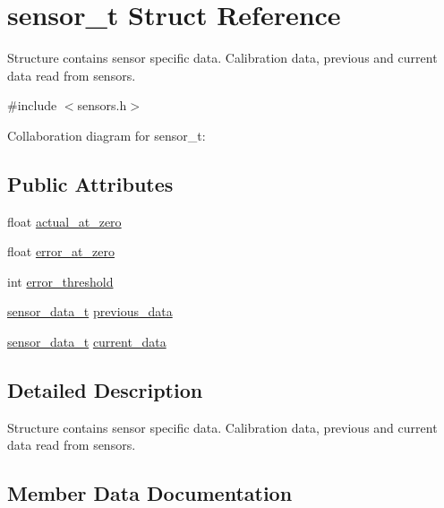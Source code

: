 \hypertarget{structsensor__t}{}\section{sensor\+\_\+t Struct Reference}
\label{structsensor__t}


Structure contains sensor specific data. Calibration data, previous and current data read from sensors.  




{\ttfamily \#include $<$sensors.\+h$>$}



Collaboration diagram for sensor\+\_\+t\+:
\subsection*{Public Attributes}
\begin{DoxyCompactItemize}
\item 
float \hyperlink{structsensor__t_a61802539633072cd29dfcf68b44d76ac}{actual\+\_\+at\+\_\+zero}
\item 
float \hyperlink{structsensor__t_acb25d3f97c5578c0c8f80b9e5aa19735}{error\+\_\+at\+\_\+zero}
\item 
int \hyperlink{structsensor__t_ae7793425eb3e2e1e15a3d58aa8ca1045}{error\+\_\+threshold}
\item 
\hyperlink{unionsensor__data__t}{sensor\+\_\+data\+\_\+t} \hyperlink{structsensor__t_ac9c62ea47e035346a20b65f4293aa9b1}{previous\+\_\+data}
\item 
\hyperlink{unionsensor__data__t}{sensor\+\_\+data\+\_\+t} \hyperlink{structsensor__t_afdccf20de5e3290862759c60637d796e}{current\+\_\+data}
\end{DoxyCompactItemize}


\subsection{Detailed Description}
Structure contains sensor specific data. Calibration data, previous and current data read from sensors. 

\subsection{Member Data Documentation}
\mbox{\label{structsensor__t_a61802539633072cd29dfcf68b44d76ac}} 
